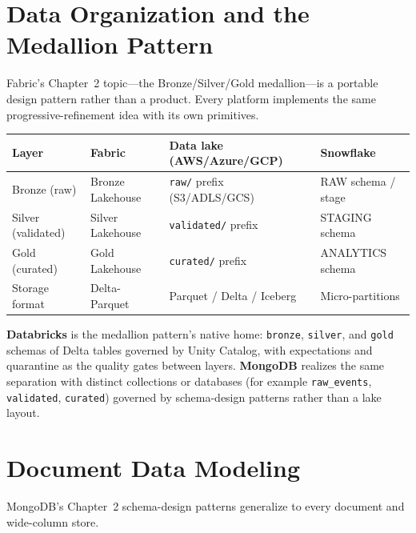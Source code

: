 \section{Data Organization and the Medallion Pattern}
%
Fabric's Chapter~2 topic---the Bronze/Silver/Gold medallion---is a portable design pattern rather
than a product. Every platform implements the same progressive-refinement idea with its own primitives.

\begin{center}
\footnotesize
\begin{tabular}{@{}p{2.6cm}p{3.4cm}p{3.4cm}p{3.0cm}@{}}
\toprule
\textbf{Layer} & \textbf{Fabric} & \textbf{Data lake (AWS/Azure/GCP)} & \textbf{Snowflake} \\
\midrule
Bronze (raw) & Bronze Lakehouse & \texttt{raw/} prefix (S3/ADLS/GCS) & RAW schema / stage \\
Silver (validated) & Silver Lakehouse & \texttt{validated/} prefix & STAGING schema \\
Gold (curated) & Gold Lakehouse & \texttt{curated/} prefix & ANALYTICS schema \\
Storage format & Delta-Parquet & Parquet / Delta / Iceberg & Micro-partitions \\
\bottomrule
\end{tabular}
\end{center}

\noindent \textbf{Databricks} is the medallion pattern's native home: \texttt{bronze},
\texttt{silver}, and \texttt{gold} schemas of Delta tables governed by Unity Catalog, with
expectations and quarantine as the quality gates between layers. \textbf{MongoDB} realizes the
same separation with distinct collections or databases (for example \texttt{raw\_events},
\texttt{validated}, \texttt{curated}) governed by schema-design patterns rather than a lake layout.

\section{Document Data Modeling}
%
MongoDB's Chapter~2 schema-design patterns generalize to every document and wide-column store.

